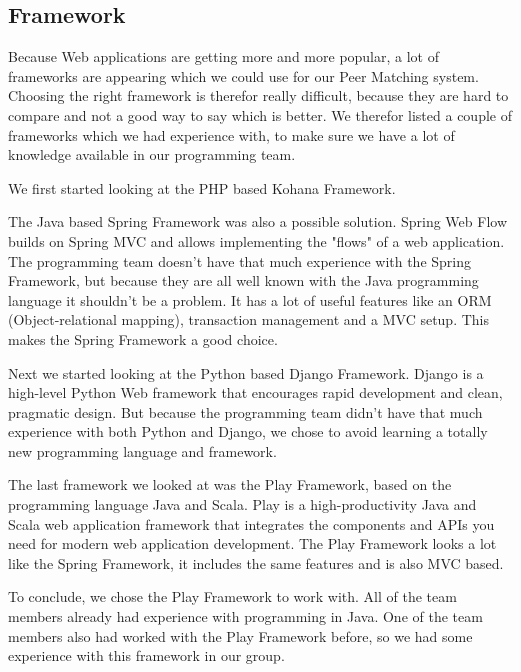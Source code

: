 \documentclass[]{article}
\begin{document}
\subsection{Framework}
Because Web applications are getting more and more popular, a lot of frameworks are appearing which we could use for our Peer Matching system.
Choosing the right framework is therefor really difficult, because they are hard to compare and not a good way to say which is better.
We therefor listed a couple of frameworks which we had experience with, to make sure we have a lot of knowledge available in our programming team.

We first started looking at the PHP based Kohana Framework\cite{kohana}.

The Java based Spring Framework\cite{spring} was also a possible solution.
Spring Web Flow builds on Spring MVC and allows implementing the "flows" of a web application.
The programming team doesn't have that much experience with the Spring Framework, but because they are all well known with the Java programming language it shouldn't be a problem.
It has a lot of useful features like an ORM (Object-relational mapping), transaction management and a MVC setup.
This makes the Spring Framework a good choice.

Next we started looking at the Python based Django Framework\cite{django}.
Django is a high-level Python Web framework that encourages rapid development and clean, pragmatic design.
But because the programming team didn't have that much experience with both Python and Django, we chose to avoid learning a totally new programming language and framework.

The last framework we looked at was the Play Framework\cite{play}, based on the programming language Java and Scala.
Play is a high-productivity Java and Scala web application framework that integrates the components and APIs you need for modern web application development.
The Play Framework looks a lot like the Spring Framework, it includes the same features and is also MVC based.

To conclude, we chose the Play Framework to work with. All of the team members already had experience with programming in Java. One of the team members also had worked with the Play Framework before, so we had some experience with this framework in our group.
\end{document}
